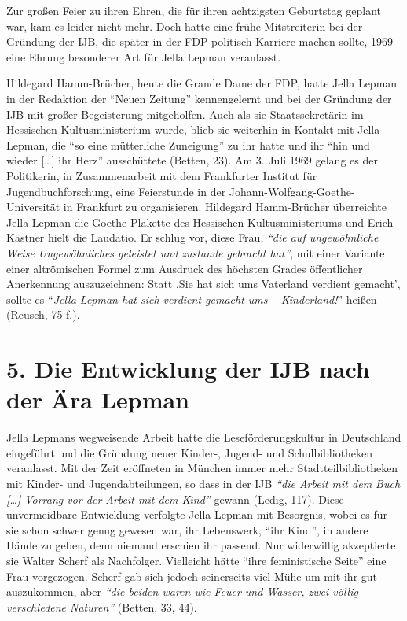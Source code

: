 \documentclass[a4paper,
fontsize=11pt,
oneside,
numbers=noperiodatend,
parskip=half-,
bibliography=totoc,
final
]{scrartcl}
\begin{document}
Zur großen Feier zu ihren Ehren, die für ihren achtzigsten Geburtstag
geplant war, kam es leider nicht mehr. Doch hatte eine frühe
Mitstreiterin bei der Gründung der IJB, die später in der FDP politisch
Karriere machen sollte, 1969 eine Ehrung besonderer Art für Jella Lepman
veranlasst.~

Hildegard Hamm-Brücher, heute die Grande Dame der FDP, hatte Jella
Lepman in der Redaktion der \enquote{Neuen Zeitung} kennengelernt und
bei der Gründung der IJB mit großer Begeisterung mitgeholfen. Auch als
sie Staatssekretärin im Hessischen Kultusministerium wurde, blieb sie
weiterhin in Kontakt mit Jella Lepman, die \enquote{so eine mütterliche
Zuneigung} zu ihr hatte und ihr \enquote{hin und wieder {[}\ldots{}{]}
ihr Herz} ausschüttete (Betten, 23). Am 3. Juli 1969 gelang es der
Politikerin, in Zusammenarbeit mit dem Frankfurter Institut für
Jugendbuchforschung, eine Feierstunde in der
Johann-Wolfgang-Goethe-Universität in Frankfurt zu organisieren.
Hildegard Hamm-Brücher überreichte Jella Lepman die Goethe-Plakette des
Hessischen Kultusministeriums und Erich Kästner hielt die Laudatio. Er
schlug vor, diese Frau, \emph{\enquote{die auf ungewöhnliche Weise
Ungewöhnliches geleistet und zustande gebracht hat}}, mit einer Variante
einer altrömischen Formel zum Ausdruck des höchsten Grades öffentlicher
Anerkennung auszuzeichnen: Statt ‚Sie hat sich ums Vaterland verdient
gemacht', sollte es \enquote{\emph{Jella Lepman hat sich verdient
gemacht ums -- Kinderland!}} heißen (Reusch, 75 f.).

\section*{5. Die Entwicklung der IJB nach der Ära
Lepman}\label{die-entwicklung-der-ijb-nach-der-uxe4ra-lepman}

Jella Lepmans wegweisende Arbeit hatte die Leseförderungskultur in
Deutschland eingeführt und die Gründung neuer Kinder-, Jugend- und
Schulbibliotheken veranlasst. Mit der Zeit eröffneten in München immer
mehr Stadtteilbibliotheken mit Kinder- und Jugendabteilungen, so dass in
der IJB \emph{\enquote{die Arbeit mit dem Buch {[}\ldots{}{]} Vorrang
vor der Arbeit mit dem Kind}} gewann (Ledig, 117). Diese unvermeidbare
Entwicklung verfolgte Jella Lepman mit Besorgnis, wobei es für sie schon
schwer genug gewesen war, ihr Lebenswerk, \enquote{ihr Kind}, in andere
Hände zu geben, denn niemand erschien ihr passend. Nur widerwillig
akzeptierte sie Walter Scherf als Nachfolger. Vielleicht hätte
\enquote{ihre feministische Seite} eine Frau vorgezogen. Scherf gab sich
jedoch seinerseits viel Mühe um mit ihr gut auszukommen, aber
\emph{\enquote{die beiden waren wie Feuer und Wasser, zwei völlig
verschiedene Naturen}} (Betten, 33, 44).
\end{document}
